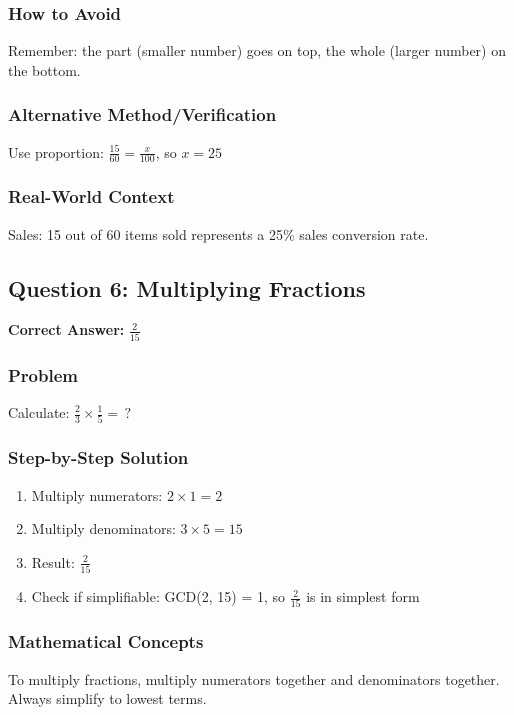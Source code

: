 \documentclass[12pt,a4paper]{article}
\begin{document}
\subsubsection*{How to Avoid}
Remember: the part (smaller number) goes on top, the whole (larger number) on the bottom.

\subsubsection*{Alternative Method/Verification}
Use proportion: $\frac{15}{60} = \frac{x}{100}$, so $x = 25$ 

\subsubsection*{Real-World Context}
Sales: 15 out of 60 items sold represents a 25\% sales conversion rate.

\vspace{0.5cm}

\subsection*{Question 6: Multiplying Fractions}

\textbf{Correct Answer:} $\frac{2}{15}$

\subsubsection*{Problem}
Calculate: $\frac{2}{3} \times \frac{1}{5} = \,?$

\subsubsection*{Step-by-Step Solution}
\begin{enumerate}
    \item Multiply numerators: $2 \times 1 = 2$
    \item Multiply denominators: $3 \times 5 = 15$
    \item Result: $\frac{2}{15}$
    \item Check if simplifiable: GCD(2, 15) = 1, so $\frac{2}{15}$ is in simplest form
\end{enumerate}

\subsubsection*{Mathematical Concepts}
To multiply fractions, multiply numerators together and denominators together. Always simplify to lowest terms.
\end{document}

